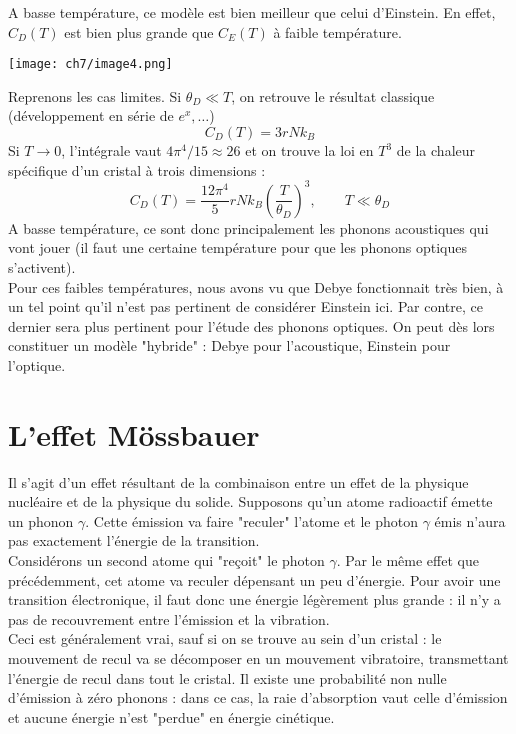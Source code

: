 	A basse température, ce modèle est bien meilleur que celui d'Einstein. En effet, 
	$C_D(T)$ est bien plus grande que $C_E(T)$ à faible température.
	\begin{center}
	\texttt{[image: ch7/image4.png]}
	\end{center}
	Reprenons les cas limites. Si $\theta_D \ll T$, on retrouve le résultat classique 
	(développement en série de $e^x,\dots$)
	\begin{equation}
	C_D(T) = 3rNk_B
	\end{equation}
	Si $T \rightarrow 0$, l'intégrale vaut $4\pi^4/15\approx 26$ et on trouve la loi 
	en $T^3$ de la chaleur spécifique d'un cristal à trois dimensions :
	\begin{equation}
	C_D(T) = \dfrac{12\pi^4}{5}rNk_B\left(\dfrac{T}{\theta_D}\right)^3,\qquad T \ll 
	\theta_D
	\end{equation}
	A basse température, ce sont donc principalement les phonons acoustiques qui vont 
	jouer (il faut une certaine température pour que les phonons optiques s'activent).\\
	Pour ces faibles températures, nous avons vu que Debye fonctionnait très bien, à 
	un tel point qu'il n'est pas pertinent de considérer Einstein ici. Par contre, ce 
	dernier sera plus pertinent pour l'étude des phonons optiques. On peut dès lors 
	constituer un modèle "hybride" : Debye pour l'acoustique, Einstein pour l'optique.
	

\section{L'effet Mössbauer}
Il s'agit d'un effet résultant de la combinaison entre un effet de la physique nucléaire 
et de la physique du solide. Supposons qu'un atome radioactif émette un phonon $\gamma$. 
Cette émission va faire "reculer" l'atome et le photon $\gamma$ émis n'aura pas 
exactement l'énergie de la transition.\\
Considérons un second atome qui "reçoit" le photon $\gamma$. Par le même effet que 
précédemment, cet atome va reculer dépensant un peu d'énergie. Pour avoir une transition 
électronique, il faut donc une énergie légèrement plus grande : il n'y a pas de 
recouvrement entre l'émission et la vibration.\\

Ceci est généralement vrai, sauf si on se trouve au sein d'un cristal : le mouvement de 
recul va se décomposer en un mouvement vibratoire, transmettant l'énergie de recul dans 
tout le cristal. Il existe une probabilité non nulle d'émission à zéro phonons : dans 
ce cas, la raie d’absorption vaut celle d'émission et aucune énergie n'est "perdue" 
en énergie cinétique.